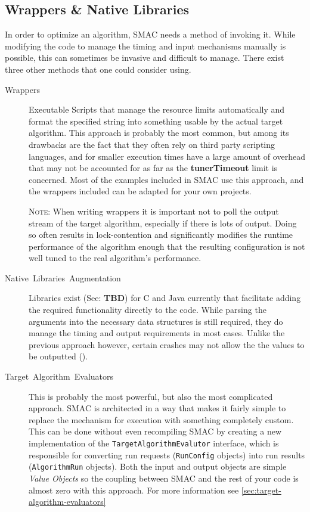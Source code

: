 \documentclass[manual.tex]{subfiles}
\begin{document}
\subsection{Wrappers \& Native Libraries}
\label{sec:exec-options}
In order to optimize an algorithm, SMAC needs a method of invoking it. While modifying the code
to manage the timing and input mechanisms manually is possible, this can sometimes be invasive and difficult to manage. There exist three other methods that one could consider using.

\begin{description}
\item [{Wrappers}] Executable Scripts that manage the resource limits automatically
and format the specified string into something usable by the actual
target algorithm. This approach is probably the most common, but among
its drawbacks are the fact that they often rely on third party scripting languages,
and for smaller execution times have a large amount of overhead that
may not be accounted for as far as the \textbf{tunerTimeout} limit is concerned. Most of the examples included in SMAC use this approach, and the wrappers included can be adapted for your own
projects.

\textsc{Note:} When writing wrappers it is important not to poll the output stream of the target algorithm, especially if there is lots of output. Doing so often results in lock-contention and significantly modifies the runtime performance of the algorithm enough that the resulting configuration is not well tuned to the real algorithm's performance.

\item [{Native~Libraries~Augmentation}] Libraries exist (See: \textbf{TBD}) for C and Java currently that facilitate adding the required functionality directly to the code. While
parsing the arguments into the necessary data structures is still required, they do manage the timing and output requirements in most cases. Unlike the previous approach however, certain crashes may not allow the the values to be outputted ().

\item [{Target~Algorithm~Evaluators}]	This is probably the most powerful, but also the most complicated approach. SMAC is architected in a way that makes it fairly simple to replace the mechanism for execution with something completely custom. This can be done without even recompiling SMAC by creating a new implementation of the \texttt{TargetAlgorithmEvalutor} interface, which is responsible for converting run requests (\texttt{RunConfig} objects) into run results (\texttt{AlgorithmRun} objects). Both the input and output objects are simple \emph{Value Objects} so the coupling between SMAC and the rest of your code is almost zero with this approach.  For more information see \ref{sec:target-algorithm-evaluators}

\end{description}
\end{document}
